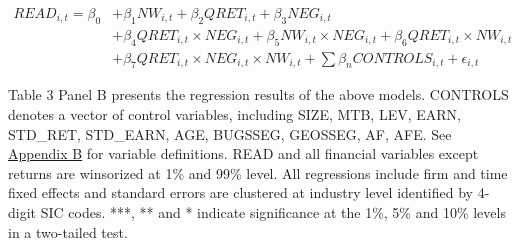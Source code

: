 \begin{table}[H]
\begin{footnotesize}
			\begin{equation*}
				\begin{split}
					READ_{i,t}=\beta_0&+\beta_1NW_{i,t}+\beta_2QRET_{i,t}+\beta_3NEG_{i,t}\\
					&+\beta_4QRET_{i,t}\times NEG_{i,t}+\beta_5NW_{i,t}\times NEG_{i,t}+\beta_6QRET_{i,t}\times NW_{i,t}\\
					&+\beta_7QRET_{i,t}\times NEG_{i,t}\times NW_{i,t}+\sum\beta_nCONTROLS_{i,t}+\epsilon_{i,t}
				\end{split}
			\end{equation*}
			
			\noindent Table 3 Panel B presents the regression results of the above models. CONTROLS denotes a vector of control variables, including SIZE, MTB, LEV, EARN, STD\_RET, STD\_EARN, AGE, BUGSSEG, GEOSSEG, AF, AFE. See \hyperref[appb]{Appendix B} for variable definitions. READ and all financial variables except returns are winsorized at 1\% and 99\% level. All regressions include firm and time fixed effects and standard errors are clustered at industry level identified by 4-digit SIC codes. ***, ** and * indicate significance at the 1\%, 5\% and 10\% levels in a two-tailed test.
		\end{footnotesize}
\end{table}%
